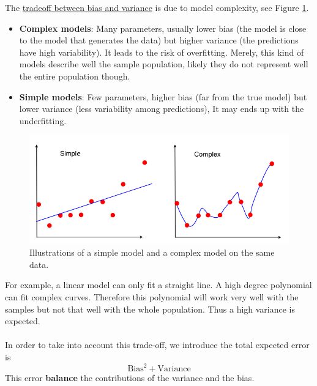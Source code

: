 The \href{http://scott.fortmann-roe.com/docs/BiasVariance.html}{tradeoff between bias and variance} is due to model complexity, see Figure \ref{fig:simple_complex}.
\begin{itemize}
 \item \textbf{Complex models}: Many parameters, usually lower bias (the model is close to the model that generates the data) but higher variance (the predictions have high variability). It leads to the risk of overfitting. Merely, this kind of models describe well the sample population, likely they do not represent well the entire population though.
 \item \textbf{Simple models}: Few parameters, higher bias (far from the true model) but lower variance (less variability among predictions), It may ends up with the underfitting.
\end{itemize}
\begin{figure}[H] %
\centerline{
\includegraphics[width=13cm]{img/07/simple_complex}
}
\caption{\label{fig:simple_complex} 
Illustrations of a simple model and a complex model on the same data.
}
\end{figure}


For example, a linear model can only fit a straight line. A high degree polynomial can fit complex curves. Therefore this polynomial will work very well with the samples but not that well with the whole population. Thus a high variance is expected.
\\\\
In order to take into account this trade-off, we introduce the total expected error is 
\[
 \textrm{Bias}^2 + \textrm{Variance}
\]
This error {\bf balance} the contributions of the variance and the bias. 

